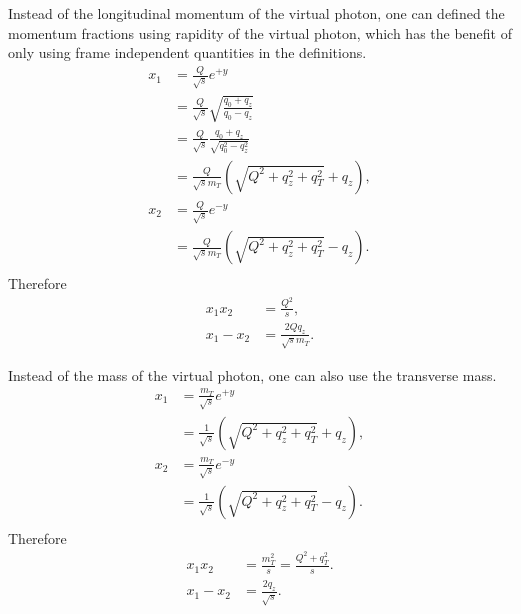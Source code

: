 \documentclass[../main.tex]{subfiles}
\begin{document}
Instead of the longitudinal momentum of the virtual photon, one can defined
the momentum fractions using rapidity of the virtual photon, which has the benefit
of only using frame independent quantities in the definitions.
\begin{equation}
	\begin{split}
		x_1 &= \frac{Q}{\sqrt{s}} e^{+y}\\
		&= \frac{Q}{\sqrt{s}} \sqrt{ \frac{q_0+q_z}{q_0-q_z} }\\
		&= \frac{Q}{\sqrt{s}} \frac{q_0+q_z}{\sqrt{q_0^2-q_z^2}}\\
		&=\frac{Q}{\sqrt{s}m_T}\left(\sqrt{Q^2+q_z^2+q_T^2}+q_z\right),\\
		x_2 &= \frac{Q}{\sqrt{s}} e^{-y}\\
		&= \frac{Q}{\sqrt{s}m_T}\left(\sqrt{Q^2+q_z^2+q_T^2}-q_z\right).\\
	\end{split}
\end{equation}
Therefore
\begin{equation}
	\begin{split}
		x_1x_2 &= \frac{Q^2}{s},\\
		x_1-x_2 &= \frac{2Qq_z}{\sqrt{s}m_T}.
	\end{split}
\end{equation}

Instead of the mass of the virtual photon, one can also use the transverse mass.
\begin{equation}
	\begin{split}
		x_1 &= \frac{m_T}{\sqrt{s}} e^{+y}\\
		&=\frac{1}{\sqrt{s}}\left(\sqrt{Q^2+q_z^2+q_T^2}+q_z\right),\\
		x_2 &= \frac{m_T}{\sqrt{s}} e^{-y}\\
		&= \frac{1}{\sqrt{s}}\left(\sqrt{Q^2+q_z^2+q_T^2}-q_z\right).\\
	\end{split}
	\label{a_eq:def3}
\end{equation}
Therefore
\begin{equation}
	\begin{split}
		x_1x_2 &= \frac{m_T^2}{s} = \frac{Q^2+q_T^2}{s}.\\
		x_1-x_2 &= \frac{2q_z}{\sqrt{s}}.
	\end{split}
\end{equation}
\clearpage
\end{document}
